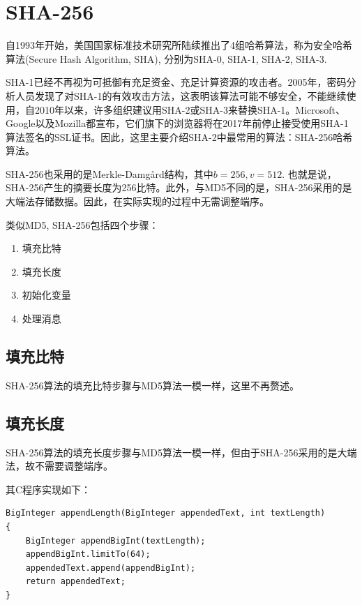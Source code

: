 \section{SHA-256}
自1993年开始，美国国家标准技术研究所陆续推出了4组哈希算法，称为安全哈希算法(Secure Hash Algorithm, SHA), 分别为SHA-0, SHA-1, SHA-2, SHA-3.\par
SHA-1已经不再视为可抵御有充足资金、充足计算资源的攻击者。2005年，密码分析人员发现了对SHA-1的有效攻击方法，这表明该算法可能不够安全，不能继续使用，自2010年以来，许多组织建议用SHA-2或SHA-3来替换SHA-1。Microsoft、Google以及Mozilla都宣布，它们旗下的浏览器将在2017年前停止接受使用SHA-1算法签名的SSL证书。因此，这里主要介绍SHA-2中最常用的算法：SHA-256哈希算法。\par
SHA-256也采用的是Merkle-Damg\aa rd结构，其中$b=256, v=512$. 也就是说，SHA-256产生的摘要长度为256比特。此外，与MD5不同的是，SHA-256采用的是大端法存储数据。因此，在实际实现的过程中无需调整端序。\par
类似MD5, SHA-256包括四个步骤：
\begin{enumerate}
    \item 填充比特
    \item 填充长度
    \item 初始化变量
    \item 处理消息
\end{enumerate}
\subsection{填充比特}
SHA-256算法的填充比特步骤与MD5算法一模一样，这里不再赘述。
\subsection{填充长度}
SHA-256算法的填充长度步骤与MD5算法一模一样，但由于SHA-256采用的是大端法，故不需要调整端序。\par
其C程序实现如下：
\begin{prove}
\begin{verbatim}
BigInteger appendLength(BigInteger appendedText, int textLength)
{
    BigInteger appendBigInt(textLength);
    appendBigInt.limitTo(64);
    appendedText.append(appendBigInt);
    return appendedText;
}
\end{verbatim}
\end{prove}
